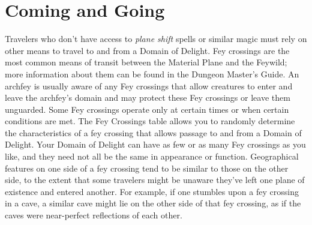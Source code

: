 \documentclass[10pt,a4paper,twoside,twocolumn,openany,nodeprecatedcode,bg=print]{dndbook}
\begin{document}
\section{Coming and Going}
Travelers who don't have access to \textit{plane shift} spells or similar magic must rely on other means to travel to and from a Domain of Delight. Fey crossings are the most common means of transit between the Material Plane and the Feywild; more information about them can be found in the Dungeon Master's Guide.
An archfey is usually aware of any Fey crossings that allow creatures to enter and leave the archfey's domain and may protect these Fey crossings or leave them unguarded. Some Fey crossings operate only at certain times or when certain conditions are met. The Fey Crossings table allows you to randomly determine the characteristics of a fey crossing that allows passage to and from a Domain of Delight. Your Domain of Delight can have as few or as many Fey crossings as you like, and they need not all be the same in appearance or function.
Geographical features on one side of a fey crossing tend to be similar to those on the other side, to the extent that some travelers might be unaware they've left one plane of existence and entered another. For example, if one stumbles upon a fey crossing in a cave, a similar cave might lie on the other side of that fey crossing, as if the caves were near-perfect reflections of each other.
\end{document}
